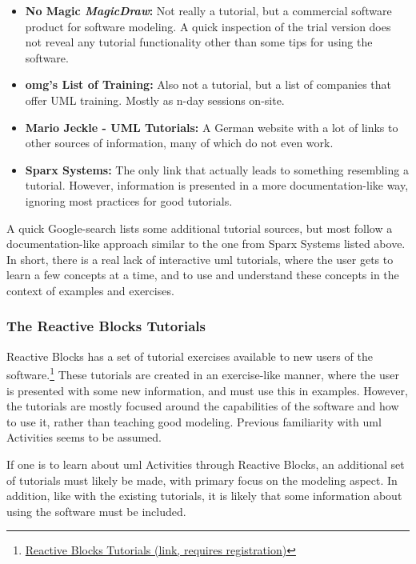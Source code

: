 \begin{itemize}
	\item{\textbf{No Magic \emph{MagicDraw}:}} Not really a tutorial, but a commercial software product for software modeling. A quick inspection of the trial version does not reveal any tutorial functionality other than some tips for using the software.
	\item{\textbf{\gls{omg}'s List of Training:}} Also not a tutorial, but a list of companies that offer UML training. Mostly as n-day sessions on-site.
	\item{\textbf{Mario Jeckle - UML Tutorials:}} A German website with a lot of links to other sources of information, many of which do not even work.
	\item{\textbf{Sparx Systems:}} The only link that actually leads to something resembling a tutorial. However, information is presented in a more documentation-like way, ignoring most practices for good tutorials.
\end{itemize}

\noindent
A quick Google-search lists some additional tutorial sources, but most follow a documentation-like approach similar to the one from Sparx Systems listed above. In short, there is a real lack of interactive \gls{uml} tutorials, where the user gets to learn a few concepts at a time, and to use and understand these concepts in the context of examples and exercises.

\subsubsection{The Reactive Blocks Tutorials}
Reactive Blocks has a set of tutorial exercises available to new users of the software.\footnote{\href{http://reference.bitreactive.com/tutorials/}{Reactive Blocks Tutorials (link, requires registration)}} These tutorials are created in an exercise-like manner, where the user is presented with some new information, and must use this in examples. However, the tutorials are mostly focused around the capabilities of the software and how to use it, rather than teaching good modeling. Previous familiarity with \gls{uml} Activities seems to be assumed.

\noindent
If one is to learn about \gls{uml} Activities through Reactive Blocks, an additional set of tutorials must likely be made, with primary focus on the modeling aspect. In addition, like with the existing tutorials, it is likely that some information about using the software must be included.

